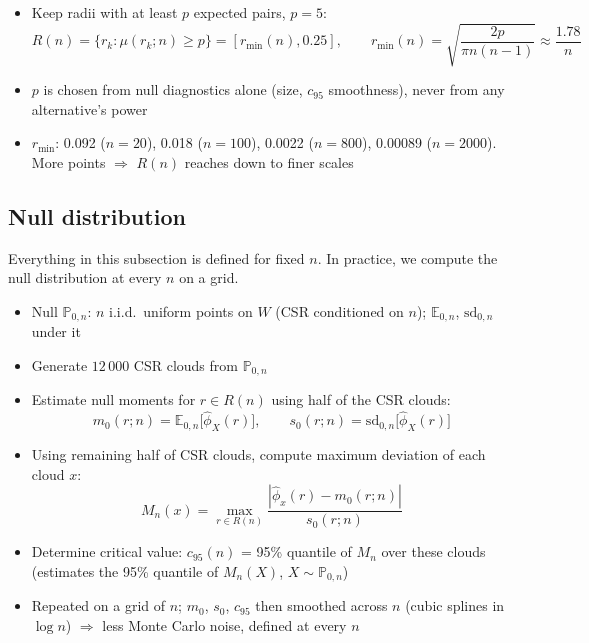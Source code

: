 \documentclass[11pt]{article}
\begin{document}
\begin{itemize}
  \smallskip
  At $p=3$ the excess is concentrated at large $n$ (residual s.d.\ 0.056 for $n\ge1000$) and locally correlated (acf 0.30): the max statistic's null distribution is lumpy there, so its 95\% quantile moves in jumps. Covariates for the grid geometry do not absorb it (mean $z^2$ 5.22 $\to$ 4.67 at best)
  \item Keep radii with at least $p$ expected pairs, $p = 5$:
  \[
    R(n) = \{r_k : \mu(r_k;n) \ge p\} = [r_{\min}(n), 0.25],
    \qquad
    r_{\min}(n) = \sqrt{\frac{2p}{\pi n(n-1)}} \approx \frac{1.78}{n}
  \]
  \item $p$ is chosen from null diagnostics alone (size, $c_{95}$ smoothness), never from any alternative's power
  \item $r_{\min}$: 0.092 ($n=20$), 0.018 ($n=100$), 0.0022 ($n=800$), 0.00089 ($n=2000$). More points $\Rightarrow$ $R(n)$ reaches down to finer scales
\end{itemize}

\subsection*{Null distribution}
Everything in this subsection is defined for fixed $n$. In practice, we compute the null distribution at every $n$ on a grid.
\begin{itemize}
  \item Null $\mathbb P_{0,n}$: $n$ i.i.d.\ uniform points on $W$ (CSR conditioned on $n$); $\mathbb E_{0,n}$, $\mathrm{sd}_{0,n}$ under it
  \item Generate $12\,000$ CSR clouds from $\mathbb P_{0,n}$
  \item Estimate null moments for $r \in R(n)$ using half of the CSR clouds:
  \[
    m_0(r;n) = \mathbb E_{0,n}\big[\hat\phi_X(r)\big],
    \qquad
    s_0(r;n) = \mathrm{sd}_{0,n}\big[\hat\phi_X(r)\big]
  \]
  \item Using remaining half of CSR clouds, compute maximum deviation of each cloud $x$:
  \[
    M_n(x) = \max_{r\in R(n)} \frac{|\hat\phi_x(r) - m_0(r;n)|}{s_0(r;n)}
  \]
  \item Determine critical value: $c_{95}(n)$ = 95\% quantile of $M_n$ over these clouds (estimates the 95\% quantile of $M_n(X)$, $X\sim\mathbb P_{0,n}$)
  \item Repeated on a grid of $n$; $m_0$, $s_0$, $c_{95}$ then smoothed across $n$ (cubic splines in $\log n$) $\Rightarrow$ less Monte Carlo noise, defined at every $n$
\end{itemize}
\end{document}
